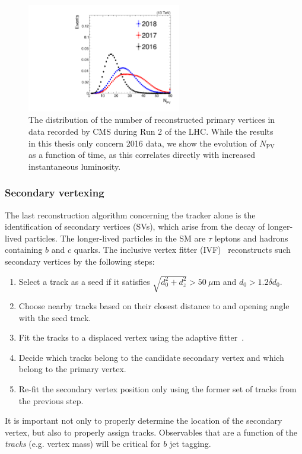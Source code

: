 \begin{figure}[]
    \begin{center} 
        \includegraphics[width=0.6\textwidth]{figures/cms/comparison_npv.pdf}
        \caption{The distribution of the number of reconstructed primary vertices in data recorded by CMS during Run 2 of the LHC.
                 While the results in this thesis only concern 2016 data, we show the evolution of $N_\mathrm{PV}$ as a function of time, as this correlates directly with increased instantaneous luminosity.}
        \label{fig:cms:npv}
    \end{center}
\end{figure}

\subsubsection{Secondary vertexing}

The last reconstruction algorithm concerning the tracker alone is the identification of secondary vertices (SVs), which arise from the decay of longer-lived particles.
The longer-lived particles in the SM are $\tau$ leptons and hadrons containing $b$ and $c$ quarks.
The inclusive vertex fitter (IVF)~\cite{csvv2} reconstructs such secondary vertices by the following steps:
\begin{enumerate}
    \item Select a track as a seed if it satisfies $\sqrt{d_0^2 + d_z^2} > 50~\mu\mathrm{m}$ and $d_0 > 1.2 \delta d_0$.
    \item Choose nearby tracks based on their closest distance to and opening angle with the seed track.
    \item Fit the tracks to a displaced vertex using the adaptive fitter~\cite{adaptivefit}.
    \item Decide which tracks belong to the candidate secondary vertex and which belong to the primary vertex.
    \item Re-fit the secondary vertex position only using the former set of tracks from the previous step.
\end{enumerate}
It is important not only to properly determine the location of the secondary vertex, but also to properly assign tracks.
Observables that are a function of the \emph{tracks} (e.g. vertex mass) will be critical for $b$ jet tagging.

